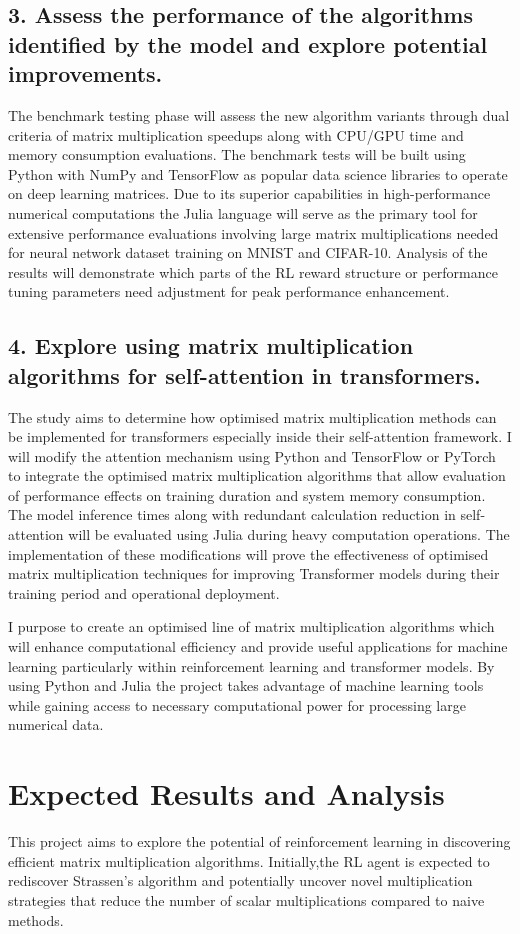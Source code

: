 \documentclass{article}
\begin{document}
\subsection*{3. Assess the performance of the algorithms identified by the model and explore potential improvements.}
The benchmark testing phase will assess the new algorithm variants through dual criteria of matrix multiplication speedups along with CPU/GPU time and memory consumption evaluations. The benchmark tests will be built using Python with NumPy and TensorFlow as popular data science libraries to operate on deep learning matrices. Due to its superior capabilities in high-performance numerical computations the Julia language will serve as the primary tool for extensive performance evaluations involving large matrix multiplications needed for neural network dataset training on MNIST and CIFAR-10. Analysis of the results will demonstrate which parts of the RL reward structure or performance tuning parameters need adjustment for peak performance enhancement.

\subsection*{4. Explore using matrix multiplication algorithms for self-attention in transformers.}
The study aims to determine how optimised matrix multiplication methods can be implemented for transformers especially inside their self-attention framework. I will modify the attention mechanism using Python and TensorFlow or PyTorch to integrate the optimised matrix multiplication algorithms that allow evaluation of performance effects on training duration and system memory consumption. The model inference times along with redundant calculation reduction in self-attention will be evaluated using Julia during heavy computation operations. The implementation of these modifications will prove the effectiveness of optimised matrix multiplication techniques for improving Transformer models during their training period and operational deployment.

I purpose to create an optimised line of matrix multiplication algorithms which will enhance computational efficiency and provide useful applications for machine learning particularly within reinforcement learning and transformer models. By using Python and Julia the project takes advantage of machine learning tools while gaining access to necessary computational power for processing large numerical data.

\section{Expected Results and Analysis}
This project aims to explore the potential of reinforcement learning in discovering efficient matrix multiplication algorithms. Initially,the RL agent is expected to rediscover Strassen's algorithm and potentially uncover novel multiplication strategies that reduce the number of scalar multiplications compared to naive methods.  
\end{document}
